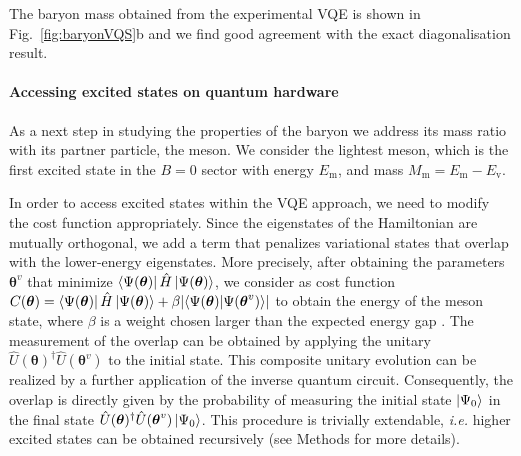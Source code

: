 \documentclass[twocolumn,aps,showpacs,prb,superscriptaddress,floatfix,10pt,nofootinbib]{revtex4-2}
\begin{document}
The baryon mass obtained from the experimental VQE is shown in Fig.~\ref{fig:baryonVQS}b and we find good agreement with the exact diagonalisation result.



\paragraph{\textbf{Accessing excited states on quantum hardware}} As a next step in studying the properties of the baryon we address its mass ratio with its partner particle, the meson. We consider the lightest meson, which is the first excited state in the $B = 0$ sector with energy $E_{\text{m}}$, and mass $M_\text{m} = E_{\text{m}} - E_{\text{v}}$.

In order to access excited states within the VQE approach, we need to modify the cost function appropriately. Since the eigenstates of the Hamiltonian are mutually orthogonal, we add a term that penalizes variational states that overlap with the lower-energy eigenstates. More precisely, after obtaining the parameters $\boldsymbol{\theta}^v$ that minimize $\bra{\Psi(\boldsymbol{\theta})}\hat{H}\ket{\Psi(\boldsymbol{\theta})}$, we consider as cost function $C(\boldsymbol{\theta}) = \bra{\Psi(\boldsymbol{\theta})}\hat{H}\ket{\Psi(\boldsymbol{\theta})} + \beta \abs{\braket{\Psi(\boldsymbol{\theta})}{\Psi(\boldsymbol{\theta}^v)}}$ to obtain the energy of the meson state, where $\beta$ is a weight chosen larger than the expected energy gap \cite{higgott_variational_2019}. The measurement of the overlap can be obtained by applying the unitary $\hat{U}(\boldsymbol{\theta})^\dagger \hat{U}(\boldsymbol{\theta}^v)$ to the initial state. This composite unitary evolution can be realized by a further application of the inverse quantum circuit. Consequently, the overlap is directly given by the probability of measuring the initial state $\ket{\Psi_0}$ in the final state $\hat{U}(\boldsymbol{\theta})^\dagger \hat{U}(\boldsymbol{\theta}^v)\ket{\Psi_0}$. This procedure is trivially extendable, \textit{i.e.} higher excited states can be obtained recursively (see Methods for more details).
\end{document}
